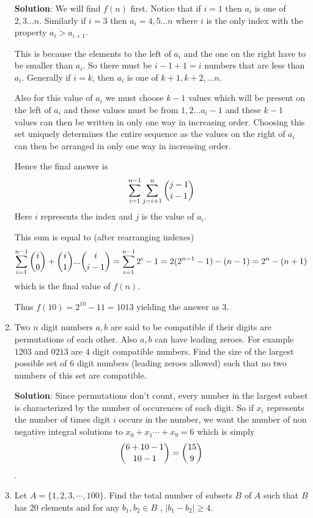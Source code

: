 \documentclass[a4paper]{article}
\begin{document}
\begin{enumerate}
\textbf{Solution}: We will find $f(n)$ first.
Notice that if $i = 1$ then $a_i$ is one of $2, 3... n$. Similarly if $i= 3$ then $a_i = 4, 5... n$ where $i$ is the only index with the property $a_i > a_{i+1} $.

This is because the elements to the left of $a_i$ and the one on the right have to be smaller than $a_i$. So there must be $i-1 + 1 = i$ numbers that are less than $a_i$.
Generally if $i = k$, then $a_i$ is one of $k+1, k+2, ... n$.

Also for this value of $a_i$ we must choose $k-1$ values which will be present on the left of $a_i$ and these values must be from $1, 2... a_i - 1$ and these $k-1$ values can then be written in only one way in increasing order.
Choosing this set uniquely determines the entire sequence as the values on the right of $a_i$ can then be arranged in only one way in increasing order.

Hence the final answer is
$$\displaystyle \sum_{i=1}^{n-1} \sum_{j=i+1}^{n} \dbinom{j-1}{i-1}$$Here $i$ represents the index and $j$ is the value of $a_i$.

This sum is equal to (after rearranging indexes) $$\sum_{i=1}^{n-1} \dbinom{i}{0} + \dbinom{i}{1} ... \dbinom{i}{i-1} = 
 \sum_{i=1}^{n-1} 2^{i} - 1 =  2(2^{n-1}-1) - (n-1) = 2^{n} - (n+1)$$ which is the final value of $f(n)$.


Thus $f(10) = 2^{10} - 11 = 1013$ yielding the answer as $3$.

\item Two $n$ digit numbers $a, b$ are said to be compatible if their digits are permutations of each other. Also $a, b$ can have leading zeroes. For example $1203$ and $0213$ are $4$ digit compatible numbers. Find the size of the largest possible set of $6$ digit numbers (leading zeroes allowed) such that no two numbers of this set are compatible.

\textbf{Solution}: Since permutations don't count, every number in the largest subset is characterized by the number of occurences of each digit.
So if $x_i$ represents the number of times digit $i$ occurs in the number, we want the number of non negative integral solutions to
$\displaystyle x_0 + x_1 \cdots +  x_9 = 6$ which is simply $$\displaystyle \dbinom{6 + 10 - 1}{10 - 1} = \dbinom {15}{9}$$. 


\item Let $A = \lbrace{1,2,3, \cdots , 100} \rbrace$. Find the total number of subsets $B$ of $A$ such that $B$ has 20 elements and for any $b_1,b_2 \in B$ , $|b_1 - b_2| \ge 4$.


\end{enumerate}
\end{document}

